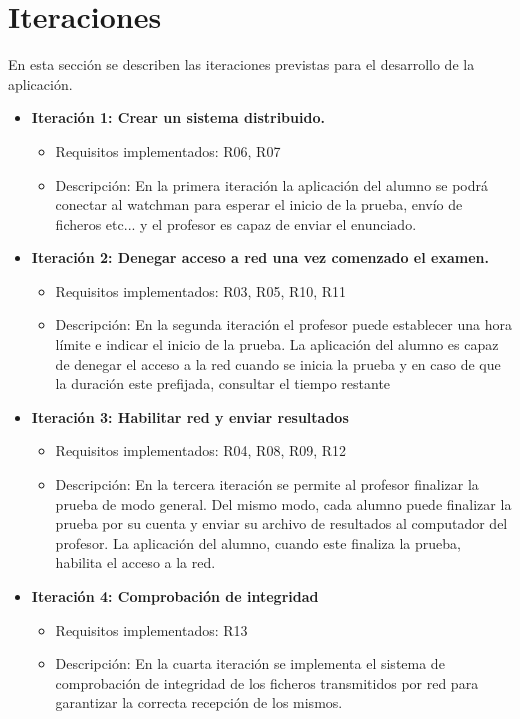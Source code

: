 \section{Iteraciones}
\label{sec:planificacion:iteraciones}

En esta sección se describen las iteraciones previstas para el desarrollo de la aplicación.

\begin{itemize}
    \item {\bfseries Iteración 1: Crear un sistema distribuido.}
    \begin{itemize}
        \item Requisitos implementados: R06, R07
        \item Descripción: En la primera iteración la aplicación del alumno se podrá conectar al watchman para esperar el inicio de la prueba, envío de ficheros etc... y el profesor es capaz de enviar el enunciado.
    \end{itemize}

    \item {\bfseries Iteración 2: Denegar acceso a red una vez comenzado el examen.}
    \begin{itemize}
        \item Requisitos implementados: R03, R05, R10, R11
        \item Descripción: En la segunda iteración el profesor puede establecer una hora límite e indicar el inicio de la prueba. La aplicación del alumno es capaz de denegar el acceso a la red cuando se inicia la prueba y en caso de que la duración este prefijada, consultar el tiempo restante
    \end{itemize}


    \item {\bfseries Iteración 3: Habilitar red y enviar resultados}
    \begin{itemize}
        \item Requisitos implementados: R04, R08, R09, R12
        \item Descripción: En la tercera iteración se permite al profesor finalizar la prueba de modo general. Del mismo modo, cada alumno puede finalizar la prueba por su cuenta y enviar su archivo de resultados al computador del profesor. La aplicación del alumno, cuando este finaliza la prueba, habilita el acceso a la red.
    \end{itemize}


    \item {\bfseries Iteración 4: Comprobación de integridad}
    \begin{itemize}
        \item Requisitos implementados: R13
        \item Descripción: En la cuarta iteración se implementa el sistema de comprobación de integridad de los ficheros transmitidos por red para garantizar la correcta recepción de los mismos.
    \end{itemize}


\end{itemize}
